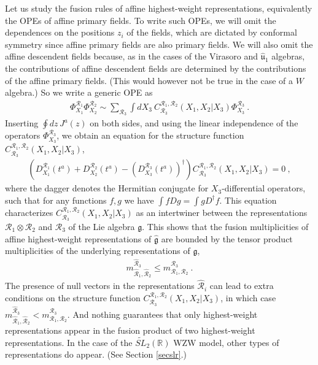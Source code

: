 \documentclass[12pt, a4paper, notitlepage, twoside]{report}
\numberwithin{equation}{section}
\theoremstyle{break}
\begin{document}
Let us study the fusion rules of affine highest-weight representations, equivalently the OPEs of affine primary fields.
To write such OPEs, we will omit the dependences on the positions $z_i$ of the fields, which are dictated by conformal symmetry since affine primary fields are also primary fields.
We will also omit the affine descendent fields because, as in the cases of the Virasoro and $\hat{\mathfrak{u}}_1$ algebras, the contributions of affine descendent fields are determined by the contributions of the affine primary fields. (This would however not be true in the case of a $W$ algebra.) So we write a generic OPE as 
\begin{align}
 \Phi^{\mathcal{R}_1}_{X_1}\Phi^{\mathcal{R}_2}_{X_2} \sim \sum_{\mathcal{R}_3} \int dX_3\ C^{\mathcal{R}_1,\mathcal{R}_2}_{\mathcal{R}_3}(X_1,X_2|X_3) \Phi^{\mathcal{R}_3}_{X_3}\ .
\end{align}
Inserting $\oint dz\, J^a(z)$ on both sides, and using the linear independence of the operators $\Phi^{\mathcal{R}_3}_{X_3}$, we obtain an equation for the structure function $C^{\mathcal{R}_1,\mathcal{R}_2}_{\mathcal{R}_3}(X_1,X_2|X_3)$,
\begin{align}
 \left(D_{X_1}^{\mathcal{R}_1}(t^a)+D_{X_2}^{\mathcal{R}_2}(t^a)-\left(D_{X_3}^{\mathcal{R}_3}(t^a)\right)^\dagger\right) C^{\mathcal{R}_1,\mathcal{R}_2}_{\mathcal{R}_3}(X_1,X_2|X_3) = 0\ ,
\label{dddc}
\end{align}
where the dagger denotes the Hermitian conjugate for $X_3$-differential operators, such that for any functions $f,g$ we have 
$\int fDg =\int g D^\dagger f$.
This equation characterizes $C^{\mathcal{R}_1,\mathcal{R}_2}_{\mathcal{R}_3}(X_1,X_2|X_3)$ as an intertwiner between the representations $\mathcal{R}_1\otimes \mathcal{R}_2$ and $\mathcal{R}_3$ of the Lie algebra $\mathfrak{g}$.
This shows that the fusion multiplicities of affine highest-weight representations of $\hat{\mathfrak{g}}$ are bounded by the tensor product multiplicities of the underlying representations of $\mathfrak{g}$, 
\begin{align}
 m_{\hat{\mathcal{R}}_1,\hat{\mathcal{R}}_2}^{\hat{\mathcal{R}}_3} \leq m_{\mathcal{R}_1,\mathcal{R}_2}^{\mathcal{R}_3}\ .
\end{align}
The presence of null vectors in the representations $\hat{\mathcal{R}}_i$ can lead to extra conditions on the structure function $C^{\mathcal{R}_1,\mathcal{R}_2}_{\mathcal{R}_3}(X_1,X_2|X_3)$, in which case $m_{\hat{\mathcal{R}}_1,\hat{\mathcal{R}}_2}^{\hat{\mathcal{R}}_3} < m_{\mathcal{R}_1,\mathcal{R}_2}^{\mathcal{R}_3}$. 
And nothing guarantees that only highest-weight representations appear in the fusion product of two highest-weight representations. 
In the case of the $\widetilde{SL}_2(\mathbb{R})$ WZW model, other types of representations do appear. (See Section \ref{secslr}.) 
\end{document}
